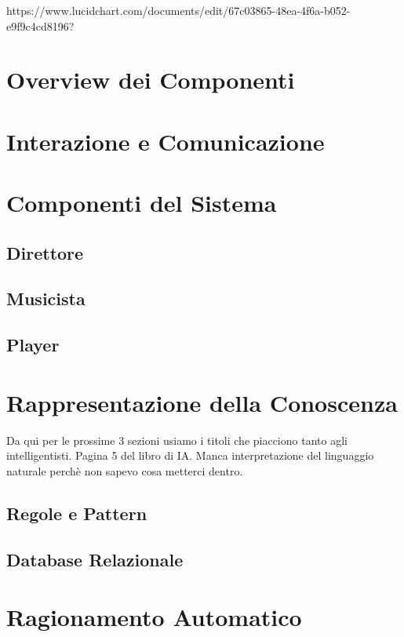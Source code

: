 \documentclass[a4paper,10pt]{article}
\begin{document}
https://www.lucidchart.com/documents/edit/67c03865-48ea-4f6a-b052-e9f9c4cd8196?

\section{Overview dei Componenti}

\section{Interazione e Comunicazione}

\section{Componenti del Sistema}
\subsection{Direttore}

\subsection{Musicista}

\subsection{Player}


\section{Rappresentazione della Conoscenza}
Da qui per le prossime 3 sezioni usiamo i titoli che piacciono tanto 
agli intelligentisti. Pagina 5 del libro di IA. 
Manca interpretazione del linguaggio naturale perchè non sapevo cosa metterci dentro.
\subsection{Regole e Pattern}
\subsection{Database Relazionale}

\section{Ragionamento Automatico}
\end{document}
